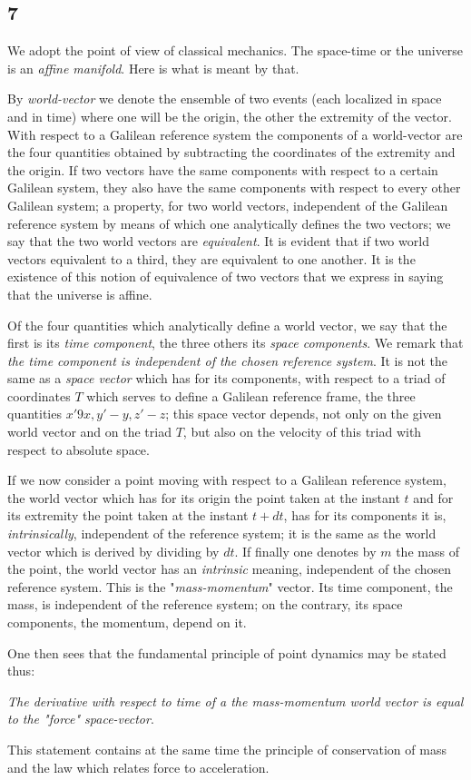 \subsection*{7}
We adopt the point of view of classical mechanics. The space-time or the universe is an \textit{affine manifold}. Here is what is meant by that.

By \textit{world-vector} we denote the ensemble of two events (each localized in space and in time) where one will be the origin, the other the extremity of the vector. With respect to a Galilean reference system the components of a world-vector are the four quantities
obtained by subtracting the coordinates of the extremity and the origin. If two vectors have the same components with respect to a certain Galilean system, they also have the same components with respect to every other Galilean system;  a property, for two world vectors, independent of the Galilean reference system by means of which one analytically defines the two vectors; we say that the two world vectors are \textit{equivalent}. It is evident that if two world vectors equivalent to a third, they are equivalent to one another. It is the existence of this notion of equivalence of two vectors that we express in saying that the universe is affine.

Of the four quantities
which analytically define a world vector, we say that the first is its \textit{time component}, the three others its \textit{space components}. We remark that \textit{the time component is independent of the chosen reference system}. It is not the same as a \textit{space vector} which has for its components, with respect to a triad of coordinates $T$ which serves to define a Galilean reference frame, the three quantities $x'9x,y'-y,z'-z$; this space vector depends, not only on the given world vector and on the triad $T$, but also on the velocity of this triad with respect to absolute space.

If we now consider a point moving with respect to a Galilean reference system, the world vector which has for its origin the point taken at the instant $t$ and for its extremity the point taken at the instant $t+dt$, has for its components
it is, \textit{intrinsically}, independent of the reference system; it is the same as the world vector
which is derived by dividing by $dt$. If finally one denotes by $m$ the mass of the point, the world vector
has an \textit{intrinsic} meaning, independent of the chosen reference system. This is the "\textit{mass-momentum}" vector. Its time component, the mass, is independent of the reference system; on the contrary, its space components, the momentum, depend on it.

One then sees that the fundamental principle of point dynamics may be stated thus:

\textit{The derivative with respect to time of a the mass-momentum world vector is equal to the "force" space-vector}.

This statement contains at the same time the principle of conservation of mass and the law which relates force to acceleration.

